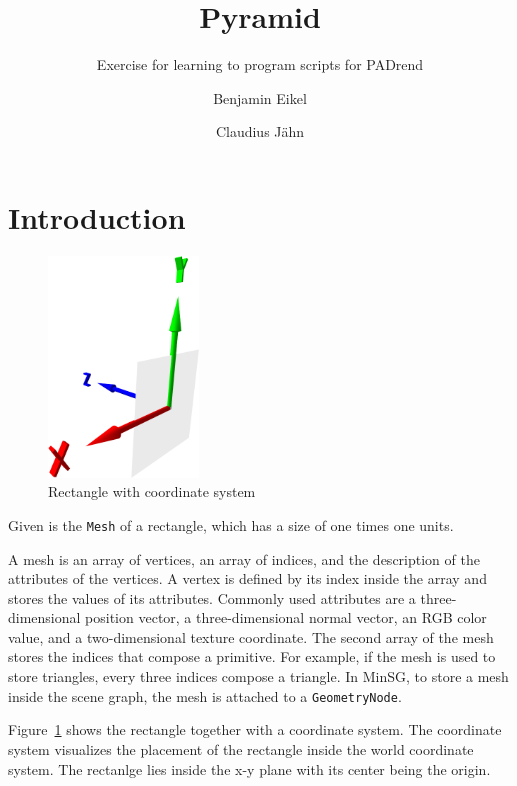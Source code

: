 \documentclass[a4paper,DIV=12]{scrartcl}
\title{Pyramid}
\subtitle{Exercise for learning to program scripts for PADrend}
\author{Benjamin Eikel \and Claudius Jähn}
\begin{document}
\maketitle
\section*{Introduction}
\begin{figure}[htbp]
	\centering
	\includegraphics[width=4cm]{rectangle}
	\caption{Rectangle with coordinate system}
	\label{fig:rectangle}
\end{figure}
Given is the \lstinline!Mesh! of a rectangle, which has a size of one times one units.

A mesh is an array of vertices, an array of indices, and the description of the attributes of the vertices.
A vertex is defined by its index inside the array and stores the values of its attributes.
Commonly used attributes are a three-dimensional position vector, a three-dimensional normal vector, an RGB color value, and a two-dimensional texture coordinate.
The second array of the mesh stores the indices that compose a primitive.
For example, if the mesh is used to store triangles, every three indices compose a triangle.
In MinSG, to store a mesh inside the scene graph, the mesh is attached to a \lstinline!GeometryNode!.

Figure~\ref{fig:rectangle} shows the rectangle together with a coordinate system.
The coordinate system visualizes the placement of the rectangle inside the world coordinate system.
The rectanlge lies inside the x-y plane with its center being the origin.
\end{document}

